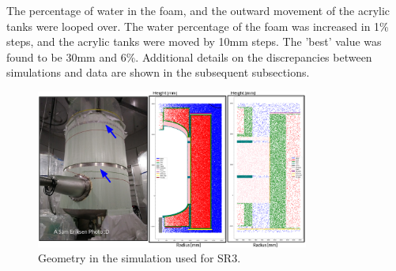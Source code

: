 The percentage of water in the foam, and the outward movement of the acrylic tanks were looped over.
The water percentage of the foam was increased in 1\% steps, and the acrylic tanks were moved by 10mm steps.
The 'best' value was found to be 30mm and 6\%.
Additional details on the discrepancies between simulations and data are shown in the subsequent subsections.

\begin{figure}
    \centering
    \includegraphics[width=0.8\textwidth]{figures/VetoEfficiency/Final_OD_geometry.png}
    \caption{Geometry in the simulation used for SR3.}
    \label{fig:od_geometry_for_sr3}
\end{figure}


